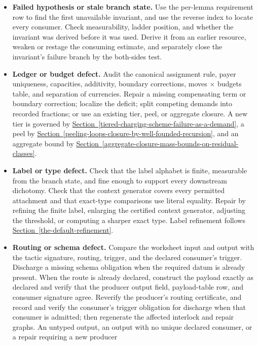 \documentclass[
  11pt,
]{article}
\theoremstyle{definition}
\newcommand{\secref}[1]{\hyperref[#1]{Section~\ref*{#1}}}
\begin{document}
\begin{enumerate}
  \begin{itemize}
  \item
    \textbf{Failed hypothesis or stale branch state.} Use the
    per-lemma requirement row to find the first unavailable invariant,
    and use the reverse index to locate every consumer. Check
    measurability, ladder position, and whether the invariant was derived
    before it was used. Derive it from an earlier resource, weaken or
    restage the consuming estimate, and separately close the invariant's
    failure branch by the both-sides test.
  \item
    \textbf{Ledger or budget defect.} Audit the canonical assignment rule,
    payer uniqueness, capacities, additivity, boundary corrections,
    moves \(\times\) budgets table, and separation of currencies.
    Repair a missing compensating term or boundary correction; localize
    the deficit; split competing demands into recorded fractions; or use
    an existing tier, peel, or aggregate closure. A new tier is governed
    by \secref{tiered-charging-scheme-failure-as-a-demand}, a peel by
    \secref{peeling-loops-closure-by-well-founded-recursion}, and an
    aggregate bound by
    \secref{aggregate-closure-mass-bounds-on-residual-classes}.
  \item
    \textbf{Label or type defect.} Check that the label alphabet is
    finite, measurable from the branch state, and fine enough to support
    every downstream dichotomy. Check that the context generator covers
    every permitted attachment and that exact-type comparisons use
    literal equality. Repair by refining the finite label, enlarging the
    certified context generator, adjusting the threshold, or computing
    a sharper exact type. Label refinement follows
    \secref{the-default-refinement}.
  \item
    \textbf{Routing or schema defect.} Compare the worksheet input and
    output with the tactic signature, routing, trigger, and the declared
    consumer's trigger. Discharge a missing schema obligation when the
    required datum is already present. When the route is already
    declared, construct the payload exactly as declared and verify that
    the producer output field, payload-table row, and consumer signature
    agree. Reverify the producer's routing certificate, and record and
    verify the consumer's trigger obligation for discharge when that
    consumer is admitted; then regenerate the affected interlock and
    repair graphs. An untyped output, an output with no
    unique declared consumer, or a repair requiring a new producer

\end{itemize}
\end{enumerate}
\end{document}
